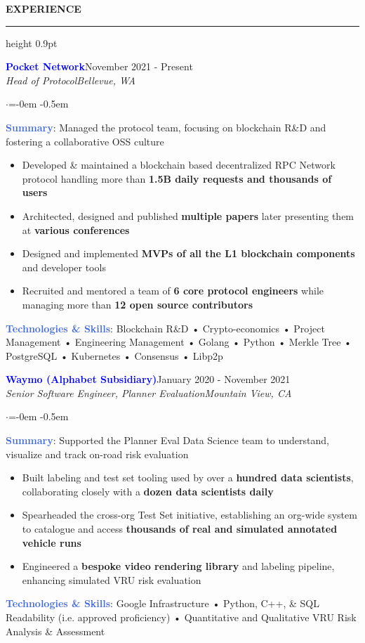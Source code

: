 \documentclass[
    11pt, %
]{resume} %
\newenvironment{rSectionCustom}[1]{
  \Large
  \sectionskip
  \textbf{\textcolor{Cerulean}{\MakeUppercase{#1}}}
  \vspace{0.5em}
  {\color{Blue}\hrule height 0.9pt}
  \vspace{0.25em}

  \begin{list}{}{
    \setlength{\leftmargin}{1.5em}
  }
  \item[]
}{
    \vspace{1em}
    \end{list}
}
\newenvironment{rSubsection2}[4]{
  \normalsize
  \hspace{-18pt}\textcolor{Blue}{\textbf{\large #1}}\hfill{#2}
  \\
  \hspace*{-18pt}\emph{#3}\hfill\emph{#4}
  \begin{list}{$\cdot$}{\leftmargin=-0em}
  \itemsep -0.5em \vspace{-0.25em}
}{
    \vspace{1em}
    \end{list}
}
\begin{document}
\begin{rSectionCustom}{Experience}

    \begin{rSubsection2}{Pocket Network}{November 2021 - Present}{Head of Protocol}{Bellevue, WA}

        \item[] \textcolor{RoyalBlue}{\textbf{Summary}}: Managed the protocol team, focusing on blockchain R\&D and fostering a collaborative OSS culture
        \begin{itemize}[leftmargin=*]
            \item Developed \& maintained a blockchain based decentralized RPC Network protocol handling more than \textbf{1.5B daily requests and thousands of users}
            \item Architected, designed and published \textbf{multiple papers} later presenting them at \textbf{various conferences}
            \item Designed and implemented \textbf{MVPs of all the L1 blockchain components} and developer tools
            \item Recruited and mentored a team of \textbf{6 core protocol engineers} while managing more than \textbf{12 open source contributors}
        \end{itemize}
        \vspace{0.5em}
        \item[] \textcolor{RoyalBlue}{\textbf{Technologies \& Skills}}: Blockchain R\&D • Crypto-economics • Project Management • Engineering Management • Golang • Python • Merkle Tree • PostgreSQL • Kubernetes • Consensus • Libp2p
    \end{rSubsection2}

    \begin{rSubsection2}{Waymo (Alphabet Subsidiary)}{January 2020 - November 2021}{Senior Software Engineer, Planner Evaluation}{Mountain View, CA}
        \item[] \textcolor{RoyalBlue}{\textbf{Summary}}: Supported the Planner Eval Data Science team to understand, visualize and track on-road risk evaluation
        \begin{itemize}[leftmargin=*]
            \item Built labeling and test set tooling used by over a \textbf{hundred data scientists}, collaborating closely with a \textbf{dozen data scientists daily}
            \item Spearheaded the cross-org Test Set initiative, establishing an org-wide system to catalogue and access \textbf{thousands of real and simulated annotated vehicle runs}
            \item Engineered a \textbf{bespoke video rendering library} and labeling pipeline, enhancing simulated VRU risk evaluation
        \end{itemize}
        \vspace{0.5em}
        \item[] \textcolor{RoyalBlue}{\textbf{Technologies \& Skills}}: Google Infrastructure • Python, C++, \& SQL Readability (i.e. approved proficiency) • Quantitative and Qualitative VRU Risk Analysis \& Assessment
    \end{rSubsection2}


\end{rSectionCustom}
\end{document}

